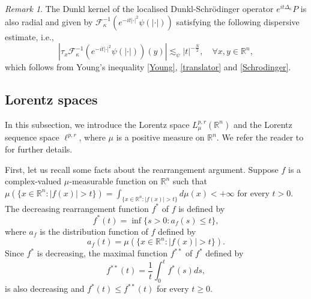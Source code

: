 \documentclass[a4paper,11pt, reqno]{amsart}
\numberwithin{equation}{section}
\theoremstyle{plain}
\theoremstyle{definition}
\theoremstyle{remark}
\newtheorem{remark}[theorem]{Remark}
\begin{document}
\begin{remark}
The Dunkl kernel of the localised  Dunkl-Schr\"{o}dinger operator $e^{it\Delta_\kappa}P$ is also radial and given by $\mathcal{F}^{-1}_\kappa (e^{-it|\cdot|^2} \psi(|\cdot|))$ satisfying the following dispersive estimate, i.e.,
\begin{equation}\label{cut-off decay}
   \left|\tau_x\mathcal{F}^{-1}_\kappa \left(e^{-it|\cdot|^2} \psi(|\cdot|)\right)(y)\right|\lesssim_\psi |t|^{-\frac{N}{2}}, \quad \forall x,y\in\mathbb{R}^n,
\end{equation}
which follows from Young's inequality \eqref{Young}, \eqref{translator} and \eqref{Schrodinger}.
\end{remark}

\subsection{Lorentz spaces}
In this subsection, we introduce the Lorentz space $L_\mu^{p,r}(\mathbb{R}^n)$ and the Lorentz sequence space $\ell^{p,r}$, where $\mu$ is a positive measure on $\mathbb{R}^n$. We refer the reader to \cite{Stein-Weiss} for further details.

First, let us recall some facts about the rearrangement argument. Suppose $f$ is a complex-valued $\mu$-measurable function on $\mathbb{R}^n$ such that $\mu\left(\{x\in\mathbb{R}^n: |f(x)|>t\}\right)=\int_{\{x\in\mathbb{R}^n: |f(x)|>t\}}d\mu(x)<+\infty$ for every $t>0$. The decreasing rearrangement function $f^*$ of $f$ is defined by
\begin{equation*}
f^*(t)=\inf\{s>0: a_f(s)\leq t\},
\end{equation*}
where $a_f$ is the distribution function of $f$ defined by
\begin{equation*}
a_f(t)=\mu\left(\{x\in\mathbb{R}^n: |f(x)|>t\}\right).
\end{equation*}
Since $f^*$ is decreasing, the maximal function $f^{**}$ of $f^*$ defined by
\begin{equation*}
f^{**}(t)=\frac{1}{t}\int_0^t f^*(s)ds, 
\end{equation*}
is also decreasing and $f^*(t)\leq f^{**}(t)$ for every $t\geq 0$.
\end{document}
